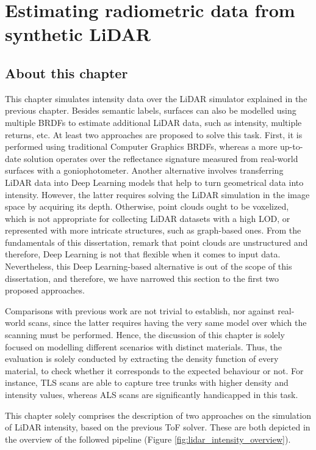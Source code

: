 \setchapterpreamble[u]{\margintoc}
\chapter{Estimating radiometric data from synthetic LiDAR}
\label{sec:lidar_intensity}

\section*{About this chapter}

This chapter simulates intensity data over the LiDAR simulator explained in the previous chapter. Besides semantic labels, surfaces can also be modelled using multiple BRDFs to estimate additional LiDAR data, such as intensity, multiple returns, etc. At least two approaches are proposed to solve this task. First, it is performed using traditional Computer Graphics BRDFs, whereas a more up-to-date solution operates over the reflectance signature measured from real-world surfaces with a goniophotometer. Another alternative involves transferring LiDAR data into Deep Learning models that help to turn geometrical data into intensity. However, the latter requires solving the LiDAR simulation in the image space by acquiring its depth. Otherwise, point clouds ought to be voxelized, which is not appropriate for collecting LiDAR datasets with a high LOD, or represented with more intricate structures, such as graph-based ones. From the fundamentals of this dissertation, remark that point clouds are unstructured and therefore, Deep Learning is not that flexible when it comes to input data. Nevertheless, this Deep Learning-based alternative is out of the scope of this dissertation, and therefore, we have narrowed this section to the first two proposed approaches.

Comparisons with previous work are not trivial to establish, nor against real-world scans, since the latter requires having the very same model over which the scanning must be performed. Hence, the discussion of this chapter is solely focused on modelling different scenarios with distinct materials. Thus, the evaluation is solely conducted by extracting the density function of every material, to check whether it corresponds to the expected behaviour or not. For instance, TLS scans are able to capture tree trunks with higher density and intensity values, whereas ALS scans are significantly handicapped in this task.  

This chapter solely comprises the description of two approaches on the simulation of LiDAR intensity, based on the previous ToF solver. These are both depicted in the overview of the followed pipeline (Figure \ref{fig:lidar_intensity_overview}).

